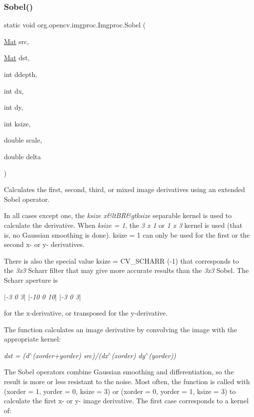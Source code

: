 \subsubsection{\texorpdfstring{Sobel()}{Sobel()}\hspace{0.1cm}{\footnotesize\ttfamily [2/3]}}
{\footnotesize\ttfamily static void org.\+opencv.\+imgproc.\+Imgproc.\+Sobel (\begin{DoxyParamCaption}\item[{\mbox{\hyperlink{classorg_1_1opencv_1_1core_1_1_mat}{Mat}}}]{src,  }\item[{\mbox{\hyperlink{classorg_1_1opencv_1_1core_1_1_mat}{Mat}}}]{dst,  }\item[{int}]{ddepth,  }\item[{int}]{dx,  }\item[{int}]{dy,  }\item[{int}]{ksize,  }\item[{double}]{scale,  }\item[{double}]{delta }\end{DoxyParamCaption})\hspace{0.3cm}{\ttfamily [static]}}

Calculates the first, second, third, or mixed image derivatives using an extended Sobel operator.

In all cases except one, the {\itshape ksize x\&lt\+BR\&gtksize} separable kernel is used to calculate the derivative. When {\itshape ksize = 1}, the {\itshape 3 x 1} or {\itshape 1 x 3} kernel is used (that is, no Gaussian smoothing is done). {\ttfamily ksize = 1} can only be used for the first or the second x-\/ or y-\/ derivatives.

There is also the special value {\ttfamily ksize = C\+V\+\_\+\+S\+C\+H\+A\+RR} (-\/1) that corresponds to the {\itshape 3x3} Scharr filter that may give more accurate results than the {\itshape 3x3} Sobel. The Scharr aperture is

{\itshape  $\vert$-\/3 0 3$\vert$ $\vert$-\/10 0 10$\vert$ $\vert$-\/3 0 3$\vert$ }

for the x-\/derivative, or transposed for the y-\/derivative.

The function calculates an image derivative by convolving the image with the appropriate kernel\+:

{\itshape dst = (d$^\wedge$(xorder+yorder) src)/(dx$^\wedge$(xorder) dy$^\wedge$(yorder))}

The Sobel operators combine Gaussian smoothing and differentiation, so the result is more or less resistant to the noise. Most often, the function is called with ({\ttfamily xorder} = 1, {\ttfamily yorder} = 0, {\ttfamily ksize} = 3) or ({\ttfamily xorder} = 0, {\ttfamily yorder} = 1, {\ttfamily ksize} = 3) to calculate the first x-\/ or y-\/ image derivative. The first case corresponds to a kernel of\+:

